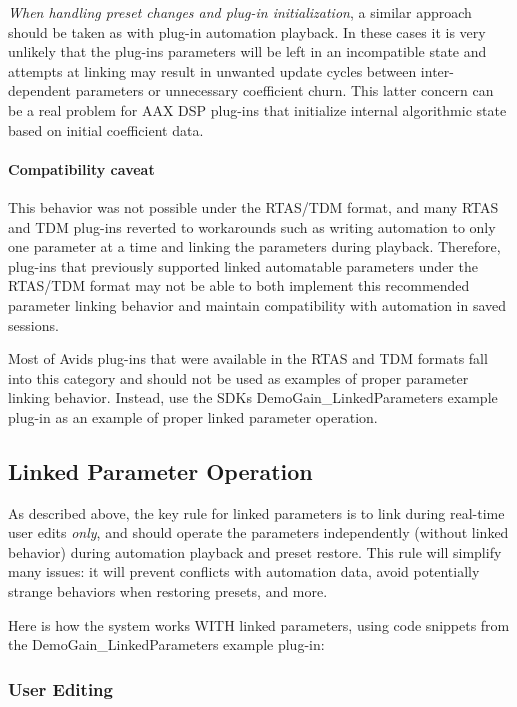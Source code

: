 {\itshape When handling preset changes and plug-\/in initialization}, a similar approach should be taken as with plug-\/in automation playback. In these cases it is very unlikely that the plug-\/in\textquotesingle{}s parameters will be left in an incompatible state and attempts at linking may result in unwanted update cycles between inter-\/dependent parameters or unnecessary coefficient churn. This latter concern can be a real problem for A\+A\+X D\+S\+P plug-\/ins that initialize internal algorithmic state based on initial coefficient data.\hypertarget{a00354_linkedParamters_behavior_caveat}{}\paragraph{Compatibility caveat}\label{a00354_linkedParamters_behavior_caveat}
This behavior was not possible under the R\+T\+A\+S/\+T\+D\+M format, and many R\+T\+A\+S and T\+D\+M plug-\/ins reverted to workarounds such as writing automation to only one parameter at a time and linking the parameters during playback. Therefore, plug-\/ins that previously supported linked automatable parameters under the R\+T\+A\+S/\+T\+D\+M format may not be able to both implement this recommended parameter linking behavior and maintain compatibility with automation in saved sessions.

Most of Avid\textquotesingle{}s plug-\/ins that were available in the R\+T\+A\+S and T\+D\+M formats fall into this category and should not be used as examples of proper parameter linking behavior. Instead, use the S\+D\+K\textquotesingle{}s Demo\+Gain\+\_\+\+Linked\+Parameters example plug-\/in as an example of proper linked parameter operation.\hypertarget{a00354_linkedParameters_linkedParameterOperation}{}\subsection{Linked Parameter Operation}\label{a00354_linkedParameters_linkedParameterOperation}
As described above, the key rule for linked parameters is to link during real-\/time user edits {\itshape only}, and should operate the parameters independently (without linked behavior) during automation playback and preset restore. This rule will simplify many issues\+: it will prevent conflicts with automation data, avoid potentially strange behaviors when restoring presets, and more.

Here is how the system works W\+I\+T\+H linked parameters, using code snippets from the Demo\+Gain\+\_\+\+Linked\+Parameters example plug-\/in\+:\hypertarget{a00354_linkedParameters_linkedParameterOperation_userEditing}{}\subsubsection{User Editing}\label{a00354_linkedParameters_linkedParameterOperation_userEditing}

